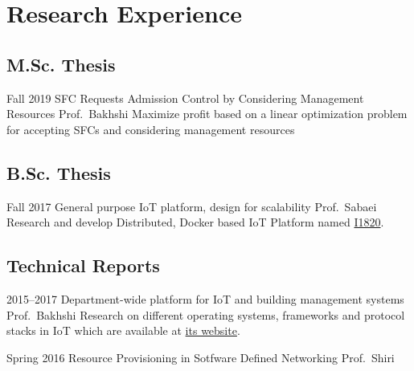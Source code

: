 \section{Research Experience}

\subsection{M.Sc. Thesis}

\cventry%
  {Fall 2019}
  {SFC Requests Admission Control by Considering Management Resources}
  {}
  {Prof.\ Bakhshi}
  {}
  {Maximize profit based on a linear optimization problem for accepting SFCs and considering management resources}

\subsection{B.Sc. Thesis}

\cventry%
  {Fall 2017}
  {General purpose IoT platform, design for scalability}
  {}
  {Prof.\ Sabaei}
  {}{%
    Research and develop Distributed, Docker based IoT Platform named \href{https://github.com/I1820}{I1820}.
  }

\subsection{Technical Reports}

\cventry%
  {2015--2017}
  {Department-wide platform for IoT and building management systems}
  {}
  {Prof.\ Bakhshi}
  {}{%
    Research on different operating systems, frameworks and protocol stacks in IoT which are available at \href{https://aolab.github.io/}{its website}.
  }

\cventry%
  {Spring 2016}
  {Resource Provisioning in Sotfware Defined Networking}
  {}
  {}
  {Prof.\ Shiri}
  {}
